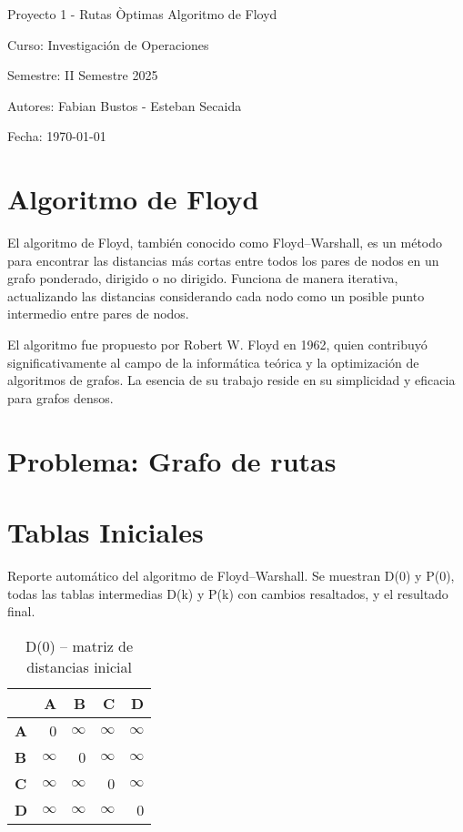 \documentclass{article}
\newcommand{\INF}{$\infty$}
\begin{document}
\begin{titlepage}
  \centering
  \vfill
  {\Huge Proyecto 1 - Rutas Òptimas Algoritmo de Floyd}\par
  \vspace{1cm}
  {\Large Curso: Investigación de Operaciones}\par
  {\Large Semestre: II Semestre 2025}\par
  \vfill
  {\Large Autores: Fabian Bustos - Esteban Secaida}\par
  \vspace{1cm}
  {\large Fecha: \today}\par
  \vfill
\end{titlepage}

\section*{Algoritmo de Floyd}
El algoritmo de Floyd, también conocido como Floyd--Warshall, es un método para encontrar las distancias más cortas entre todos los pares de nodos en un grafo ponderado, dirigido o no dirigido. Funciona de manera iterativa, actualizando las distancias considerando cada nodo como un posible punto intermedio entre pares de nodos.

El algoritmo fue propuesto por Robert W. Floyd en 1962, quien contribuyó significativamente al campo de la informática teórica y la optimización de algoritmos de grafos. La esencia de su trabajo reside en su simplicidad y eficacia para grafos densos.

\section*{Problema: Grafo de rutas}
\section*{Tablas Iniciales}
Reporte automático del algoritmo de Floyd--Warshall. Se muestran D(0) y P(0), todas las tablas intermedias D(k) y P(k) con cambios resaltados, y el resultado final.

\begin{table}[H]\centering
\caption{D(0) -- matriz de distancias inicial}
\begin{tabular}{l r r r r}
\toprule
 & \textbf{A} & \textbf{B} & \textbf{C} & \textbf{D}\\\midrule
\textbf{A} & 0 & \INF & \INF & \INF \\
\textbf{B} & \INF & 0 & \INF & \INF \\
\textbf{C} & \INF & \INF & 0 & \INF \\
\textbf{D} & \INF & \INF & \INF & 0 \\
\bottomrule
\end{tabular}
\end{table}
\end{document}
